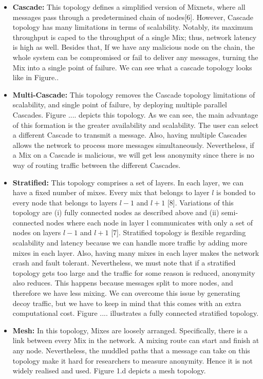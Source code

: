 \documentclass[logo,msc,cyber]{infthesis}   %
\begin{document}
\begin{itemize}
   \item \textbf{Cascade:} This topology defines a simplified version of
   Mixnets, where all messages pass through a predetermined chain of nodes[6].
   However, Cascade topology has many limitations in terms of scalability.
   Notably, its maximum throughput is caped to the throughput of a single Mix;
   thus, network latency is high as well. Besides that, If we have any malicious
   node on the chain, the whole system can be compromised or fail to deliver any
   messages, turning the Mix into a single point of failure. We can see what a
   cascade topology looks like in Figure..
   \item \textbf{Multi-Cascade:} This topology removes the Cascade topology
   limitations of scalability, and single point of failure, by deploying
   multiple parallel Cascades. Figure .... depicts this topology. As we can see,
   the main advantage of this formation is the greater availability and
   scalability. The user can select a different Cascade to transmit a message.
   Also, having multiple Cascades allows the network to process more messages
   simultaneously. Nevertheless, if a Mix on a Cascade is malicious, we will get
   less anonymity since there is no way of routing traffic between the different
   Cascades.
   \item \textbf{Stratified:} This topology comprises a set of layers. In each
   layer, we can have a fixed number of mixes. Every mix that belongs to layer
   $l$ is bonded to every node that belongs to layers $l-1$ and $l+1$ [8].
   Variations of this topology are (i) fully connected nodes as described above
   and (ii) semi-connected nodes where each node in layer l communicates with
   only a set of nodes on layers $l-1$ and $l+1$ [7]. Stratified topology is
   flexible regarding scalability and latency because we can handle more traffic
   by adding more mixes in each layer. Also, having many mixes in each layer
   makes the network crash and fault tolerant. Nevertheless, we must note that
   if a stratified topology gets too large and the traffic for some reason is
   reduced, anonymity also reduces. This happens because messages split to more
   nodes, and therefore we have less mixing. We can overcome this issue by
   generating decoy traffic, but we have to keep in mind that this comes with an
   extra computational cost. Figure .... illustrates a fully connected
   stratified topology.
   \item \textbf{Mesh:} In this topology, Mixes are loosely arranged.
   Specifically, there is a link between every Mix in the network. A mixing
   route can start and finish at any node. Nevertheless, the muddled paths that
   a message can take on this topology make it hard for researchers to measure
   anonymity. Hence it is not widely realised and used. Figure 1.d depicts a
   mesh topology.
\end{itemize}
\end{document}
